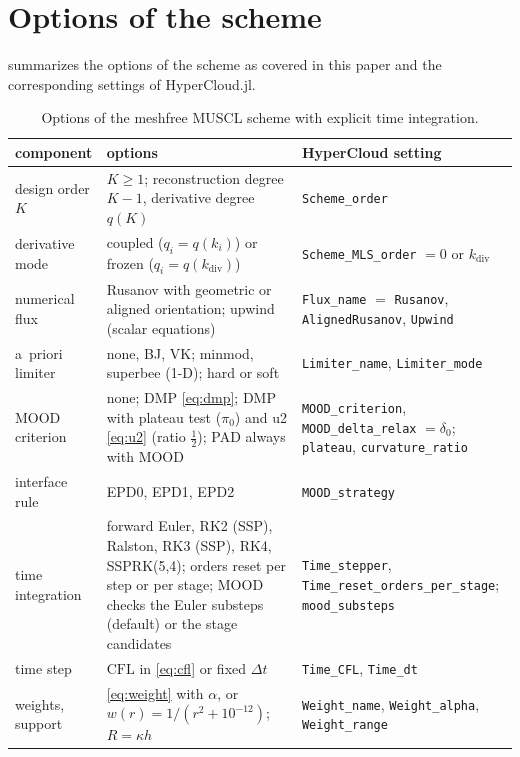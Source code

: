 \documentclass[11pt,a4paper]{article}
\numberwithin{equation}{section}
\newcommand{\qdiv}{q}
\newcommand{\CFL}{\mathrm{CFL}}
\begin{document}
\section{Options of the scheme}\label{app:options}

 summarizes the options of the scheme as covered in this paper and the corresponding settings of HyperCloud.jl.

\begin{table}[!htbp]
\centering
\caption{Options of the meshfree MUSCL scheme with explicit time integration.}\label{tab:options}
\small
\begin{tabular}{>{\raggedright\arraybackslash}p{3.4cm}>{\raggedright\arraybackslash}p{6.2cm}>{\raggedright\arraybackslash}p{4.6cm}}
\toprule
component & options & HyperCloud setting\\
\midrule
design order $K$ & $K\ge1$; reconstruction degree $K-1$, derivative degree $\qdiv(K)$ & \texttt{Scheme\_order}\\
derivative mode & coupled ($q_i=\qdiv(k_i)$) or frozen ($q_i=\qdiv(k_{\mathrm{div}})$) & \texttt{Scheme\_MLS\_order} $=0$ or $k_{\mathrm{div}}$\\
numerical flux & Rusanov with geometric or aligned orientation; upwind (scalar equations) & \texttt{Flux\_name} $=$ \texttt{Rusanov}, \texttt{AlignedRusanov}, \texttt{Upwind}\\
a~priori limiter & none, BJ, VK; minmod, superbee (1-D); hard or soft & \texttt{Limiter\_name}, \texttt{Limiter\_mode}\\
MOOD criterion & none; DMP \eqref{eq:dmp}; DMP with plateau test ($\pi_0$) and u2 \eqref{eq:u2} (ratio $\tfrac12$); PAD always with MOOD & \texttt{MOOD\_criterion}, \texttt{MOOD\_delta\_relax} $=\delta_0$; \texttt{plateau}, \texttt{curvature\_ratio}\\
interface rule & EPD0, EPD1, EPD2 & \texttt{MOOD\_strategy}\\
time integration & forward Euler, RK2 (SSP), Ralston, RK3 (SSP), RK4, SSPRK(5,4); orders reset per step or per stage; MOOD checks the Euler substeps (default) or the stage candidates & \texttt{Time\_stepper}, \texttt{Time\_reset\_orders\_}\allowbreak\texttt{per\_stage}; \texttt{mood\_substeps}\\
time step & $\CFL$ in \eqref{eq:cfl} or fixed $\Delta t$ & \texttt{Time\_CFL}, \texttt{Time\_dt}\\
weights, support & \eqref{eq:weight} with $\alpha$, or $w(r)=1/(r^2+10^{-12})$; $R=\kappa h$ & \texttt{Weight\_name}, \texttt{Weight\_alpha}, \texttt{Weight\_range}\\
\bottomrule
\end{tabular}
\end{table}
\end{document}
